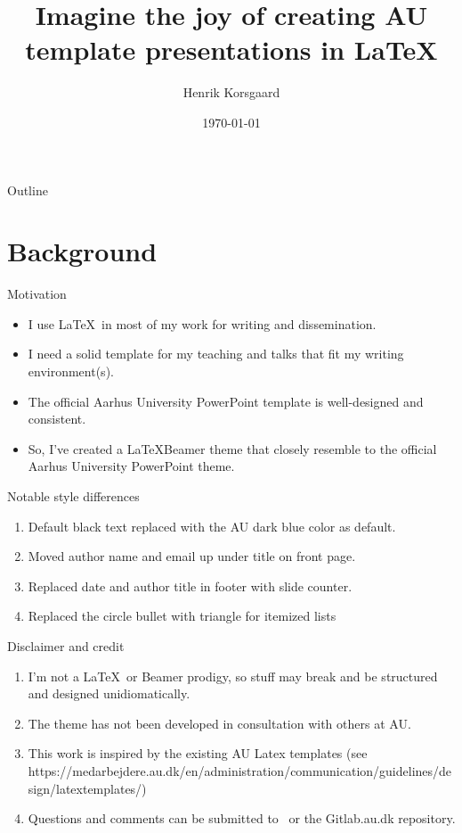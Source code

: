 \documentclass[aspectratio=169]{beamer}
\title[AU LaTeX theme]{Imagine the joy of creating AU template presentations in LaTeX}
\date[]{\today}
\author[korsgaard@cs.au.dk]{Henrik Korsgaard}
\institute{DEPARTMENT OF COMPUTER SCIENCE} %
\begin{document}
\begin{frame}
\maketitle
\end{frame}

\begin{frame}{Outline}
\tableofcontents
\end{frame}

\section{Background}
\begin{frame}{Motivation}
\begin{itemize}
    \item I use \LaTeX\ in most of my work for writing and dissemination.
    \item I need a solid template for my teaching and talks that fit my writing environment(s).
    \item The official Aarhus University PowerPoint template is well-designed and consistent. 
    \item So, I've created a \LaTeX Beamer theme that closely resemble to the official Aarhus University PowerPoint theme.
\end{itemize}
\end{frame}

\begin{frame}{Notable style differences}

\begin{enumerate}
    \item Default black text replaced with the AU dark blue color as default.
    \item Moved author name and email up under title on front page.
    \item Replaced date and author title in footer with slide counter.
    \item Replaced the circle bullet with triangle for itemized lists
\end{enumerate}
\end{frame}

\begin{frame}[AUMagenta]{Disclaimer and credit}
\begin{enumerate}
    \item I'm not a \LaTeX\ or Beamer prodigy, so stuff may break and be structured and designed unidiomatically.
    \item The theme has not been developed in consultation with others at AU.
    \item This work is inspired by the existing AU Latex templates (see https://medarbejdere.au.dk/en/administration/communication/guidelines/design/latextemplates/)
    \item Questions and comments can be submitted to \insertshortauthor\ or the Gitlab.au.dk repository.
\end{enumerate}
\end{frame}
\end{document}
